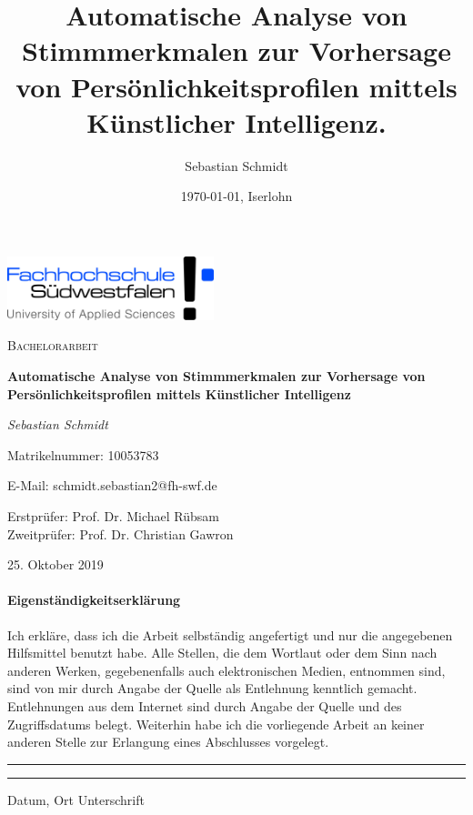 \documentclass[11pt,bibliography=totocnumbered]{scrartcl}
\title{Automatische Analyse von Stimmmerkmalen zur Vorhersage von Persönlichkeitsprofilen mittels Künstlicher Intelligenz.}
\author{Sebastian Schmidt}
\date{\today{}, Iserlohn}
\begin{document}
 
\setmainfont{Caladea}
\begin{titlepage}
	\centering
	\includegraphics[width=0.45\textwidth]{fh-swf-logo}\par\vspace{1cm}
	{\scshape\Large Bachelorarbeit\par}
	\vspace{0.5cm}
	{\huge\bfseries Automatische Analyse von Stimmmerkmalen zur Vorhersage von Persönlichkeitsprofilen mittels Künstlicher Intelligenz\par}
	\vspace{1cm}
	{\Large\itshape Sebastian Schmidt\par}
	Matrikelnummer: 10053783\par
	E-Mail: schmidt.sebastian2@fh-swf.de\par
	\vspace{1cm}
	Erstprüfer: 
	Prof. Dr. Michael Rübsam\\ 
	\vspace{1mm}
	Zweitprüfer: 
	Prof. Dr. Christian Gawron
	\vfill
	
	{\large 25. Oktober 2019\par}
\end{titlepage}
\pagebreak
\paragraph{Eigenständigkeitserklärung}
Ich erkläre, dass ich die Arbeit selbständig angefertigt und nur die angegebenen Hilfsmittel benutzt habe. Alle Stellen, die dem Wortlaut oder dem Sinn nach anderen Werken, gegebenenfalls auch elektronischen Medien, entnommen sind, sind von mir durch Angabe der Quelle als Entlehnung kenntlich gemacht. Entlehnungen aus dem Internet sind durch Angabe der Quelle und des Zugriffsdatums belegt. Weiterhin habe ich die vorliegende 
Arbeit an keiner anderen Stelle zur Erlangung eines Abschlusses vorgelegt.

\vspace{50pt}
\noindent\rule{5cm}{.4pt}\hspace{4.8cm}\rule{5cm}{.4pt}\par
\noindent Datum, Ort \hspace{10.5cm} Unterschrift
\pagebreak
\tableofcontents
\pagebreak
\listoffigures
\lstlistoflistings
\pagebreak
\listofmyequations
{}
\pagestyle{scrheadings}
\clearscrheadfoot
\ohead[\pagemark]{\pagemark}
\ihead[]{\headmark}
\setcounter{equation}{0}
\end{document}
